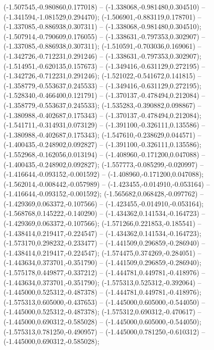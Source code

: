 (-1.507545,-0.980860,0.177018) -- (-1.338068,-0.981480,0.304510) -- (-1.341594,-1.081529,0.294470);
 (-1.506901,-0.883119,0.178701) -- (-1.337085,-0.886938,0.307311) -- (-1.338068,-0.981480,0.304510);
 (-1.507914,-0.790609,0.176055) -- (-1.338631,-0.797353,0.302907) -- (-1.337085,-0.886938,0.307311);
 (-1.510591,-0.703036,0.169061) -- (-1.342726,-0.712231,0.291246) -- (-1.338631,-0.797353,0.302907);
 (-1.514951,-0.620135,0.157673) -- (-1.349416,-0.631129,0.272195) -- (-1.342726,-0.712231,0.291246);
 (-1.521022,-0.541672,0.141815) -- (-1.358779,-0.553637,0.245533) -- (-1.349416,-0.631129,0.272195);
 (-1.528340,-0.466400,0.121791) -- (-1.370137,-0.478494,0.212084) -- (-1.358779,-0.553637,0.245533);
 (-1.535283,-0.390882,0.098867) -- (-1.380988,-0.402687,0.175343) -- (-1.370137,-0.478494,0.212084);
 (-1.541711,-0.314931,0.073129) -- (-1.391100,-0.326111,0.135586) -- (-1.380988,-0.402687,0.175343);
 (-1.547610,-0.238629,0.044571) -- (-1.400435,-0.248902,0.092827) -- (-1.391100,-0.326111,0.135586);
 (-1.552968,-0.162056,0.013194) -- (-1.408960,-0.171200,0.047088) -- (-1.400435,-0.248902,0.092827);
 (-1.557773,-0.085299,-0.020997) -- (-1.416644,-0.093152,-0.001592) -- (-1.408960,-0.171200,0.047088);
 (-1.562014,-0.008442,-0.057989) -- (-1.423455,-0.014910,-0.053164) -- (-1.416644,-0.093152,-0.001592);
 (-1.565682,0.068428,-0.097762) -- (-1.429369,0.063372,-0.107566) -- (-1.423455,-0.014910,-0.053164);
 (-1.568768,0.145222,-0.140290) -- (-1.434362,0.141534,-0.164723) -- (-1.429369,0.063372,-0.107566);
 (-1.571266,0.221853,-0.185541) -- (-1.438414,0.219417,-0.224547) -- (-1.434362,0.141534,-0.164723);
 (-1.573170,0.298232,-0.233477) -- (-1.441509,0.296859,-0.286940) -- (-1.438414,0.219417,-0.224547);
 (-1.574475,0.374269,-0.284051) -- (-1.443634,0.373701,-0.351790) -- (-1.441509,0.296859,-0.286940);
 (-1.575178,0.449877,-0.337212) -- (-1.444781,0.449781,-0.418976) -- (-1.443634,0.373701,-0.351790);
 (-1.575313,0.525312,-0.392064) -- (-1.445000,0.525312,-0.487378) -- (-1.444781,0.449781,-0.418976);
 (-1.575313,0.605000,-0.437653) -- (-1.445000,0.605000,-0.544050) -- (-1.445000,0.525312,-0.487378);
 (-1.575312,0.690312,-0.470617) -- (-1.445000,0.690312,-0.585028) -- (-1.445000,0.605000,-0.544050);
 (-1.575313,0.781250,-0.490957) -- (-1.445000,0.781250,-0.610312) -- (-1.445000,0.690312,-0.585028);
